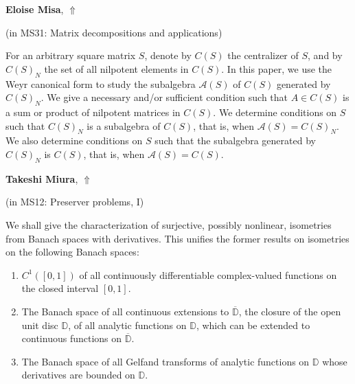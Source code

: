 \documentclass[ILAS2025-program.tex]{subfiles}
\begin{document}
\hypertarget{down0275}{}\begin{ilasabstract}
    
\textbf{Eloise Misa},  \hfill \hyperlink{up0275}{$\Uparrow$}
    
    
(in {\color{mstitle}MS31: Matrix decompositions and applications})
        
\mtskip
    For an arbitrary square matrix $S$, denote by $C(S)$ the centralizer of $S$, and by $C(S)_N$ the set of all nilpotent elements in $C(S)$.
In this paper, we use the Weyr canonical form to study the subalgebra $\mathcal{A}(S)$ of $C(S)$ generated by $C(S)_N$. We give a necessary and/or sufficient condition such that $A \in C(S)$ is a sum or product of nilpotent matrices in $C(S)$. We determine conditions on $S$ such that $C(S)_N$ is a subalgebra of $C(S)$, that is, when $\mathcal{A}(S)=C(S)_N$. We also determine conditions on $S$ such that the subalgebra generated by $C(S)_N$ is $C(S)$, that is, when $\mathcal{A}(S)=C(S)$.
\end{ilasabstract}
    

\hypertarget{down0164}{}\begin{ilasabstract}
    
\textbf{Takeshi Miura},  \hfill \hyperlink{up0164}{$\Uparrow$}
    
    
(in {\color{mstitle}MS12: Preserver problems, I})
        
\mtskip
    We shall give the characterization of surjective, possibly nonlinear,
isometries from Banach spaces with derivatives.
This unifies the former results on isometries on the following
Banach spaces:
\begin{enumerate}
\item
$C^1([0,1])$ of all continuously differentiable complex-valued functions
on the closed interval $[0,1]$.

\item
The Banach space of all continuous extensions to $\overline{\mathbb{D}}$,
the closure of the open unit disc $\mathbb{D}$,
of all analytic functions on $\mathbb{D}$,
which can be extended to continuous functions on $\overline{\mathbb{D}}$.

\item
The Banach space of all Gelfand transforms of analytic functions
on $\mathbb{D}$ whose derivatives are bounded on $\mathbb{D}$.
\end{enumerate}

\end{ilasabstract}
    
\end{document}
